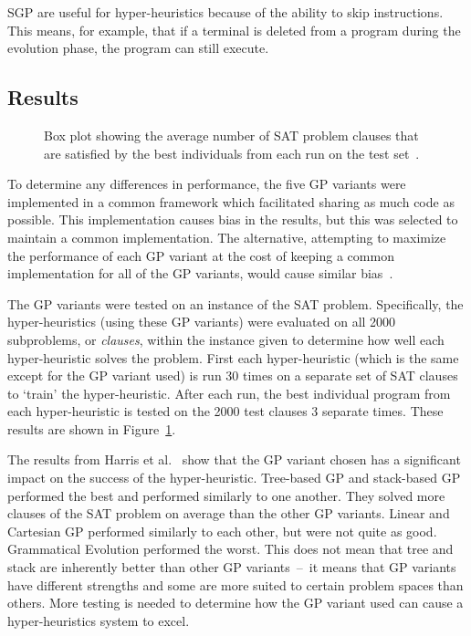 \documentclass{sig-alternate}
\begin{document}
SGP are useful for hyper-heuristics because of the ability to skip instructions. This means, for example, that if a terminal is deleted from a program during the evolution phase, the program can still execute.

\subsection{Results}
\label{sec:gpresults}
\begin{figure}
	\centering
	\caption{Box plot showing the average number of SAT problem clauses that are satisfied by the best individuals from each run on the test set~\cite{harris:2015}.}
	\label{fig:gpvariants}
\end{figure}

To determine any differences in performance, the five GP variants were implemented in a common framework which facilitated sharing as much code as possible. This implementation causes bias in the results, but this was selected to maintain a common implementation. The alternative, attempting to maximize the performance of each GP variant at the cost of keeping a common implementation for all of the GP variants, would cause similar bias~\cite{harris:2015}.

The GP variants were tested on an instance of the SAT problem. Specifically, the hyper-heuristics (using these GP variants) were evaluated on all 2000 subproblems, or \textit{clauses}, within the instance given to determine how well each hyper-heuristic solves the problem. First each hyper-heuristic (which is the same except for the GP variant used) is run 30 times on a separate set of SAT clauses to `train' the hyper-heuristic. After each run, the best individual program from each hyper-heuristic is tested on the 2000 test clauses 3 separate times. These results are shown in Figure~\ref{fig:gpvariants}.

The results from Harris et al.~\cite{harris:2015} show that the GP variant chosen has a significant impact on the success of the hyper-heuristic. Tree-based GP and stack-based GP performed the best and performed similarly to one another. They solved more clauses of the SAT problem on average than the other GP variants. Linear and Cartesian GP performed similarly to each other, but were not quite as good. Grammatical Evolution performed the worst. This does not mean that tree and stack are inherently better than other GP variants~--~it means that GP variants have different strengths and some are more suited to certain problem spaces than others. More testing is needed to determine how the GP variant used can cause a hyper-heuristics system to excel.
\end{document}
